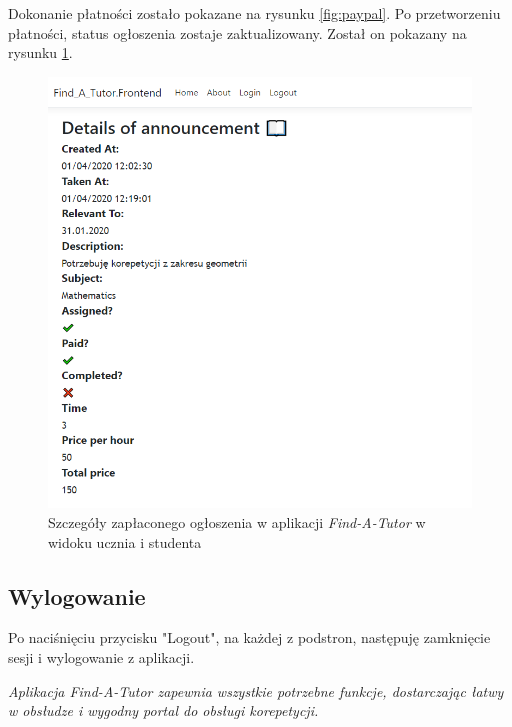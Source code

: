 \documentclass[12pt]{article}
\numberwithin{figure}{section}
\begin{document}
\begin{sloppypar}
Dokonanie płatności zostało pokazane na rysunku \ref{fig:paypal}. Po przetworzeniu płatności, status ogłoszenia zostaje zaktualizowany. Został on pokazany na rysunku \ref{fig:details-paid}.
\begin{figure}[!htbp] 
    \captionsetup{justification=centering}
    \centering
    \includegraphics[width=1\textwidth]{images/chapter_4/details-paid.png}
    \caption{Szczegóły zapłaconego ogłoszenia w aplikacji \textit{Find-A-Tutor} w widoku ucznia i studenta}
    \label{fig:details-paid}
\end{figure}

\subsection{Wylogowanie}
Po naciśnięciu przycisku "Logout", na każdej z podstron, następuję zamknięcie sesji i wylogowanie z aplikacji. \newline

\textit{Aplikacja Find-A-Tutor zapewnia wszystkie potrzebne funkcje, dostarczając łatwy w obsłudze i wygodny portal do obsługi korepetycji.}

\pagebreak

\end{sloppypar}
\end{document}
